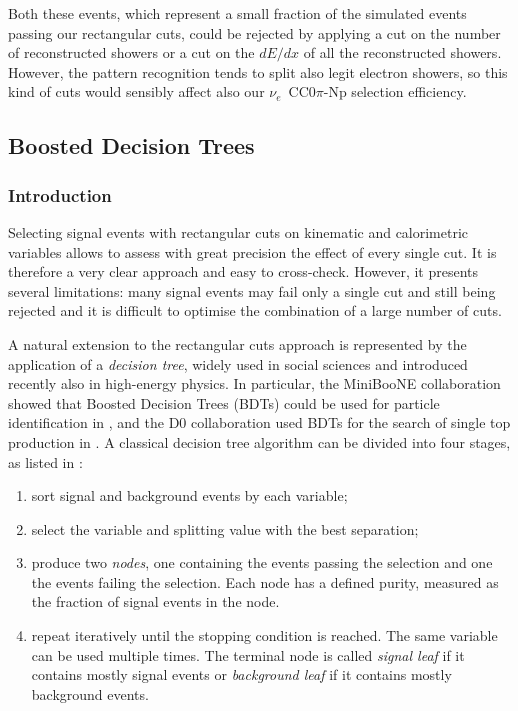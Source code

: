 Both these events, which represent a small fraction of the simulated events passing our rectangular cuts, could be rejected by applying a cut on the number of reconstructed showers or a cut on the $dE/dx$ of all the reconstructed showers. However, the pattern recognition tends to split also legit electron showers, so this kind of cuts would sensibly affect also our $\nu_e$~CC0$\pi$-Np selection efficiency.

\subsection{Boosted Decision Trees}\label{sec:bdt}
\subsubsection*{Introduction}
Selecting signal events with rectangular cuts on kinematic and calorimetric variables allows to assess with great precision the effect of every single cut. It is therefore a very clear approach and easy to cross-check. However, it presents several limitations: many signal events may fail only a single cut and still being rejected and it is difficult to optimise the combination of a large number of cuts. 

A natural extension to the rectangular cuts approach is represented by the application of a \emph{decision tree}, widely used in social sciences and introduced recently also in high-energy physics. In particular, the MiniBooNE collaboration showed that Boosted Decision Trees (BDTs) could be used for particle identification in \cite{Yang:2005nz}, and the D0 collaboration used BDTs for the search of single top production in \cite{Abazov:2006gd}.
A classical decision tree algorithm can be divided into four stages, as listed in \cite{Coadou:2013lca}:
\begin{enumerate}
    \item sort signal and background events by each variable;
    \item select the variable and splitting value with the best separation;
    \item produce two \emph{nodes}, one containing the events passing the selection and one the events failing the selection. Each node has a defined purity, measured as the fraction of signal events in the node.
    \item repeat iteratively until the stopping condition is reached. The same variable can be used multiple times. The terminal node is called \emph{signal leaf} if it contains mostly signal events or \emph{background leaf} if it contains mostly background events.
\end{enumerate}

